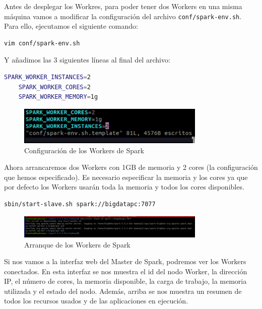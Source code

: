 Antes de desplegar los Workres, para poder tener dos Workers en una misma máquina vamos a modificar la configuración del archivo \texttt{conf/spark-env.sh}. Para ello, ejecutamos el siguiente comando:

\begin{lstlisting}[language=bash]
    vim conf/spark-env.sh
\end{lstlisting}

Y añadimos las 3 siguientes líneas al final del archivo:

\begin{lstlisting}[language=bash]
    SPARK_WORKER_INSTANCES=2
    SPARK_WORKER_CORES=2
    SPARK_WORKER_MEMORY=1g
\end{lstlisting}

\begin{figure}[H]
    \centering
    \includegraphics[width=0.8\textwidth]{figures/20.png}
    \caption{Configuración de los Workers de Spark}
\end{figure}

Ahora arrancaremos dos Workers con 1GB de memoria y 2 cores (la configuración que hemos especificado). Es necesario especificar la memoria y los cores ya que por defecto los Workers usarán toda la memoria y todos los cores disponibles.

\begin{lstlisting}[language=bash]
    sbin/start-slave.sh spark://bigdatapc:7077
\end{lstlisting}

\begin{figure}[H]
    \centering
    \includegraphics[width=0.8\textwidth]{figures/19.png}
    \caption{Arranque de los Workers de Spark}
\end{figure}

Si nos vamos a la interfaz web del Master de Spark, podremos ver los Workers conectados. En esta interfaz se nos muestra el id del nodo Worker, la dirección IP, el número de cores, la memoria disponible, la carga de trabajo, la memoria utilizada y el estado del nodo. Además, arriba se nos muestra un resumen de todos los recursos usados y de las aplicaciones en ejecución.


